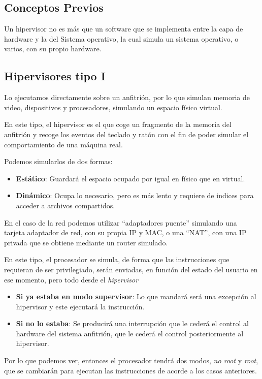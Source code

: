 \subsection{Conceptos Previos}
Un hipervisor no es más que un software que se implementa entre la capa de hardware y la del Sistema operativo, la cual simula un sistema operativo, o varios, con su propio hardware.
\subsection{Hipervisores tipo I}
Lo ejecutamos directamente sobre un anfitrión, por lo que simulan memoria de video, dispositivos y procesadores, simulando un espacio físico virtual.
\par  En este tipo, el hipervisor es el que coge un fragmento de la memoria del anfitrión y recoge los eventos del teclado y ratón con el fin de poder simular el comportamiento de una máquina real.
\par  Podemos simularlos de dos formas:
\begin{itemize}
        \item \textbf{Estático}: Guardará el espacio ocupado por igual en físico que en virtual.
        \item \textbf{Dinámico}: Ocupa lo necesario, pero es más lento y requiere de indices para acceder a archivos compartidos.
\end{itemize}
En el caso de la red podemos utilizar ``adaptadores puente'' simulando una tarjeta adaptador de red, con su propia IP y MAC, o una ``NAT'', con una IP privada que se obtiene mediante un router simulado.
\par  En este tipo, el procesador se simula, de forma que las instrucciones que requieran de ser privilegiado, serán enviadas, en función del estado del usuario en ese momento, pero todo desde el \textit{hipervisor}
\begin{itemize}
        \item \textbf{Si ya estaba en modo supervisor}: Lo que mandará será una excepción al hipervisor y este ejecutará la instrucción.
        \item \textbf{Si no lo estaba}: Se producirá una interrupción que le cederá el control al hardware del sistema anfitrión, que le cederá el control posteriormente al hipervisor.
\end{itemize}
Por lo que podemos ver, entonces el procesador tendrá dos modos, \textit{no root} y \textit{root}, que se cambiarán para ejecutan las instrucciones de acorde a los casos anteriores.
